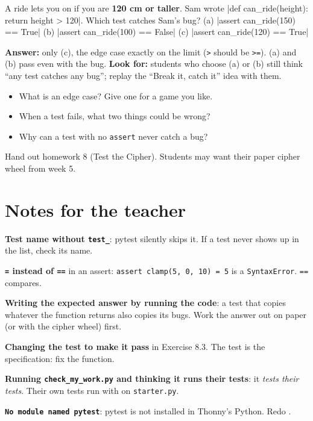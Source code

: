 \begin{formativecheck}
A ride lets you on if you are \textbf{120 cm or taller}. Sam wrote \py|def can_ride(height): return height > 120|. Which test catches Sam's bug?
\quad (a) \py|assert can_ride(150) == True| \quad (b) \py|assert can_ride(100) == False| \quad (c) \py|assert can_ride(120) == True|
\par\textbf{Answer:} only (c), the edge case exactly on the limit (\texttt{>} should be \texttt{>=}). (a) and (b) pass even with the bug.
\textbf{Look for:} students who choose (a) or (b) still think \enquote{any test catches any bug}; replay the \enquote{Break it, catch it} idea with them.
\end{formativecheck}

\begin{reflection}
\begin{itemize}[leftmargin=1.2em]
  \item What is an edge case? Give one for a game you like.
  \item When a test fails, what two things could be wrong?
  \item Why can a test with no \texttt{assert} never catch a bug?
\end{itemize}
\end{reflection}
Hand out homework 8 (Test the Cipher). Students may want their paper cipher wheel from week 5.

\section{Notes for the teacher}
\begin{commonmistakes}
  \item \textbf{Test name without \texttt{test\_}}: pytest silently skips it. If a test never shows up in the list, check its name.
  \item \textbf{\texttt{=} instead of \texttt{==}} in an assert: \texttt{assert clamp(5, 0, 10) = 5} is a \texttt{SyntaxError}. \texttt{==} compares.
  \item \textbf{Writing the expected answer by running the code}: a test that copies whatever the function returns also copies its bugs. Work the
        answer out on paper (or with the cipher wheel) first.
  \item \textbf{Changing the test to make it pass} in Exercise 8.3. The test is the specification: fix the function.
  \item \textbf{Running \texttt{check\_my\_work.py} and thinking it runs their tests}: it \emph{tests their tests}. Their own tests run with  on \texttt{starter.py}.
  \item \textbf{\texttt{No module named pytest}}: pytest is not installed in Thonny's Python. Redo .
\end{commonmistakes}

